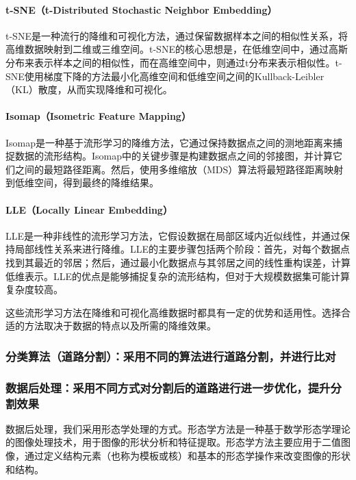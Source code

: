 \documentclass[12pt,hyperref,a4paper,UTF8]{ctexart}
\begin{document}
\paragraph{t-SNE（t-Distributed Stochastic Neighbor Embedding）}
t-SNE是一种流行的降维和可视化方法，通过保留数据样本之间的相似性关系，将高维数据映射到二维或三维空间。t-SNE的核心思想是，在低维空间中，通过高斯分布来表示样本之间的相似性，而在高维空间中，则通过t分布来表示相似性。t-SNE使用梯度下降的方法最小化高维空间和低维空间之间的Kullback-Leibler（KL）散度，从而实现降维和可视化。

\paragraph{Isomap（Isometric Feature Mapping）}
Isomap是一种基于流形学习的降维方法，它通过保持数据点之间的测地距离来捕捉数据的流形结构。Isomap中的关键步骤是构建数据点之间的邻接图，并计算它们之间的最短路径距离。然后，使用多维缩放（MDS）算法将最短路径距离映射到低维空间，得到最终的降维结果。

\paragraph{LLE（Locally Linear Embedding）}
LLE是一种非线性的流形学习方法，它假设数据在局部区域内近似线性，并通过保持局部线性关系来进行降维。LLE的主要步骤包括两个阶段：首先，对每个数据点找到其最近的邻居；然后，通过最小化数据点与其邻居之间的线性重构误差，计算低维表示。LLE的优点是能够捕捉复杂的流形结构，但对于大规模数据集可能计算复杂度较高。

\par
这些流形学习方法在降维和可视化高维数据时都具有一定的优势和适用性。选择合适的方法取决于数据的特点以及所需的降维效果。


\subsubsection{分类算法（道路分割）：采用不同的算法进行道路分割，并进行比对}

\subsubsection{数据后处理：采用不同方式对分割后的道路进行进一步优化，提升分割效果}
数据后处理，我们采用形态学处理的方式。形态学方法是一种基于数学形态学理论的图像处理技术，用于图像的形状分析和特征提取。形态学方法主要应用于二值图像，通过定义结构元素（也称为模板或核）和基本的形态学操作来改变图像的形状和结构。
\end{document}

